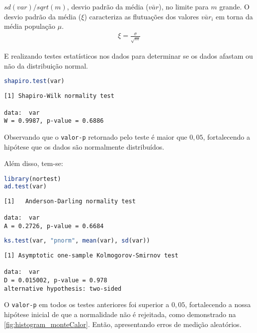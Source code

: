 $sd(var) / sqrt(m)$, desvio padrão da média ($\bar{var}$), no limite para $m$ grande. O desvio padrão da média ($\xi$) caracteriza as flutuações dos valores $\bar{var}_{i}$ em torna da média população $\mu$.
\begin{gather*}
   \xi = \frac{\sigma}{\sqrt{m}}
\end{gather*}

E realizando testes estatísticos nos dados para determinar se os dados afastam ou não da distribuição normal.

\begin{lstlisting}[name=coding_at_monte_carlo,language=R,style=macrocode,numbers=none]
shapiro.test(var)
\end{lstlisting}
\begin{lstlisting}[name=coding_at_monte_carlo,style=macrocode,frame=single,numbers=none]
[1]	Shapiro-Wilk normality test

data:  var
W = 0.9987, p-value = 0.6886
\end{lstlisting}

Observando que o \verb|valor-p| retornado pelo teste é maior que $0{,}05$, fortalecendo a hipótese que os dados são normalmente distribuídos.

Além disso, tem-se:
\begin{lstlisting}[name=coding_at_monte_carlo,language=R,style=macrocode,numbers=none]
library(nortest)
ad.test(var)
\end{lstlisting}
\begin{lstlisting}[name=coding_at_monte_carlo,style=macrocode,frame=single,numbers=none]
[1]   Anderson-Darling normality test

data:  var
A = 0.2726, p-value = 0.6684
\end{lstlisting}

\begin{lstlisting}[name=coding_at_monte_carlo,language=R,style=macrocode,numbers=none]
ks.test(var, "pnorm", mean(var), sd(var))
\end{lstlisting}
\begin{lstlisting}[name=coding_at_monte_carlo,style=macrocode,frame=single,numbers=none]
[1]	Asymptotic one-sample Kolmogorov-Smirnov test

data:  var
D = 0.015002, p-value = 0.978
alternative hypothesis: two-sided
\end{lstlisting}

O \verb|valor-p| em todos os testes anteriores foi superior a $0{,}05$, fortalecendo a nossa hipótese inicial de que a normalidade não é rejeitada, como demonstrado na \autoref{fig:histogram_monteCalor}. Então, apresentando erros de medição aleatórios.